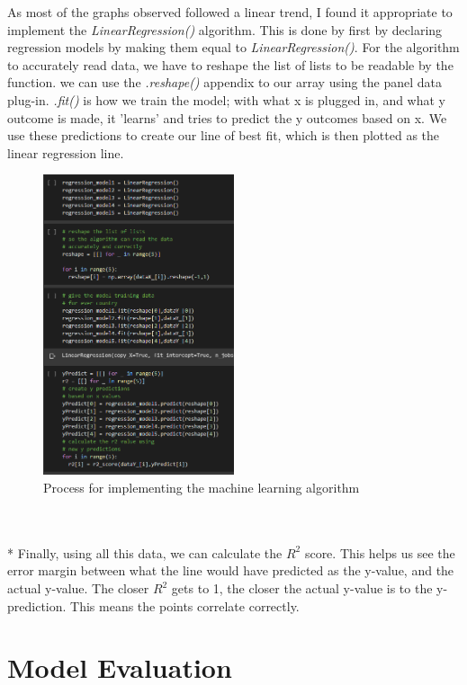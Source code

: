 \documentclass[journal,onecolumn]{IEEEtran}
\begin{document}
\newline As most of the graphs observed followed a linear trend, I found it appropriate to implement the {\it LinearRegression()} algorithm. This is done by first by declaring regression models by making them equal to {\it LinearRegression()}. For the algorithm to accurately read data, we have to reshape the list of lists to be readable by the function. we can use the {\it .reshape()} appendix to our array using the panel data plug-in. {\it .fit()} is how we train the model; with what x is plugged in, and what y outcome is made, it 'learns' and tries to predict the y outcomes based on x. We use these predictions to create our line of best fit, which is then plotted as the linear regression line.

     \begin{figure}[h]
	\centering
  	\includegraphics[width=0.5\textwidth]{img/Model-Dev.png}
    \centering
    \caption{ Process for implementing the machine learning algorithm}	
  	\label{fig:MLA}
\end{figure}\\

\\* Finally, using all this data, we can calculate the $R^2$ score. This helps us see the error margin between what the line would have predicted as the y-value, and the actual y-value. The closer $R^2$ gets to 1, the closer the actual y-value is to the y-prediction. This means the points correlate correctly.

\newpage

\section{Model Evaluation}
\end{document}

